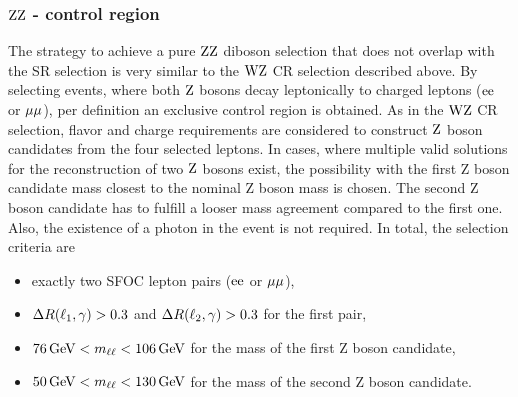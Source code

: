 \subsubsection*{$\mathrm{Z}\mathrm{Z}$ - control region}\label{sec:VR}
The strategy to achieve a pure $\mathrm{Z}\mathrm{Z}$ diboson selection that does not overlap with the SR selection is very similar to the $\mathrm{W}\mathrm{Z}$ CR selection described above. By selecting events, where both $\mathrm{Z}$ bosons decay leptonically to charged leptons ($\mathrm{e}\mathrm{e}$ or $\mu\mu$), per definition an exclusive control region is obtained. As in the $\mathrm{W}\mathrm{Z}$ CR selection, flavor and charge requirements are considered to construct $\mathrm{Z}$ boson candidates from the four selected leptons. In cases, where multiple valid solutions for the reconstruction of two $\mathrm{Z}$ bosons exist, the possibility with the first Z boson candidate mass closest to the nominal Z boson mass is chosen. The second Z boson candidate has to fulfill a looser mass agreement compared to the first one. Also, the existence of a photon in the event is not required. In total, the selection criteria are
\begin{itemize}
 \item exactly two SFOC lepton pairs ($\mathrm{e}\mathrm{e}$ or $\mu\mu$),
 \item $\Delta R(\ell_1,\gamma)>0.3$ and $\Delta R(\ell_2,\gamma)>0.3$ for the first pair,
 \item $76\,\text{Ge\hspace{-.08em}V}<m_{\ell\ell}<106\,\text{Ge\hspace{-.08em}V}$ for the mass of the first Z boson candidate,
 \item $50\,\text{Ge\hspace{-.08em}V}<m_{\ell\ell}<130\,\text{Ge\hspace{-.08em}V}$ for the mass of the second Z boson candidate.
\end{itemize}
